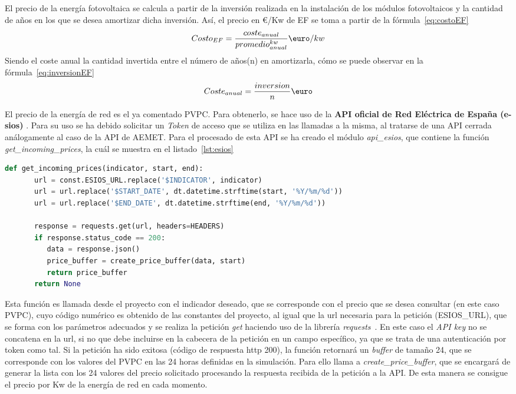 	El precio de la energía fotovoltaica se calcula a partir de la inversión realizada en la instalación de los módulos fotovoltaicos y la cantidad de años en los que se desea amortizar dicha inversión. Así, el precio en €/Kw de EF se toma a partir de la fórmula~\ref{eq:costoEF}
	\begin{equation}
          \label{eq:costoEF}
	Costo_{EF} = \frac{coste_{anual}}{promedio^{kw}_{anual}} \textup{\euro}/kw
	\end{equation}
	Siendo el coste anual la cantidad invertida entre el número de años(n) en amortizarla, cómo se puede observar en la fórmula~\ref{eq:inversionEF}
	\begin{equation}
          \label{eq:inversionEF}
	Coste_{anual} = \frac{inversion}{n} \textup{\euro}
	\end{equation}


	El precio de la energía de red es el ya comentado PVPC. Para obtenerlo, se hace uso de la \textbf{API oficial de Red Eléctrica de España (e-sios)} \cite{Ree}. Para su uso se ha debido solicitar un \textit{Token} de acceso que se utiliza en las llamadas a la misma, al tratarse de una API cerrada análogamente al caso de la API de AEMET. Para el procesado de esta API se ha creado el módulo \textit{api\_esios}, que contiene la función \textit{get\_incoming\_prices}, la cuál se muestra en el listado~\ref{lst:esios}

	\begin{lstlisting}[language=Python,float=ht,caption={Función para obtener los valores del precio eléctrico},label={lst:esios}]
	def get_incoming_prices(indicator, start, end):
	   url = const.ESIOS_URL.replace('$INDICATOR', indicator)
	   url = url.replace('$START_DATE', dt.datetime.strftime(start, '%Y/%m/%d'))
	   url = url.replace('$END_DATE', dt.datetime.strftime(end, '%Y/%m/%d'))

	   response = requests.get(url, headers=HEADERS)
	   if response.status_code == 200:
	      data = response.json()
	      price_buffer = create_price_buffer(data, start)
	      return price_buffer
	   return None
	\end{lstlisting}

	Esta función es llamada desde el proyecto con el indicador deseado, que se corresponde con el precio que se desea consultar (en este caso PVPC), cuyo código numérico es obtenido de las constantes del proyecto, al igual que la url necesaria para la petición (ESIOS\_URL), que se forma con los parámetros adecuados y se realiza la petición \textit{get} haciendo uso de la librería \textit{requests}~\cite{Kenn11}. En este caso el \textit{API key} no se concatena en la url, si no que debe incluirse en la cabecera de la petición en un campo específico, ya que se trata de una autenticación por token como tal. Si la petición ha sido exitosa (código de respuesta http 200), la función retornará un \textit{buffer} de tamaño 24, que se corresponde con los valores del PVPC en las 24 horas definidas en la simulación. Para ello llama a \textit{create\_price\_buffer}, que se encargará de generar la lista con los 24 valores del precio solicitado procesando la respuesta recibida de la petición a la API.
	De esta manera se consigue el precio por Kw de la energía de red en cada momento.

